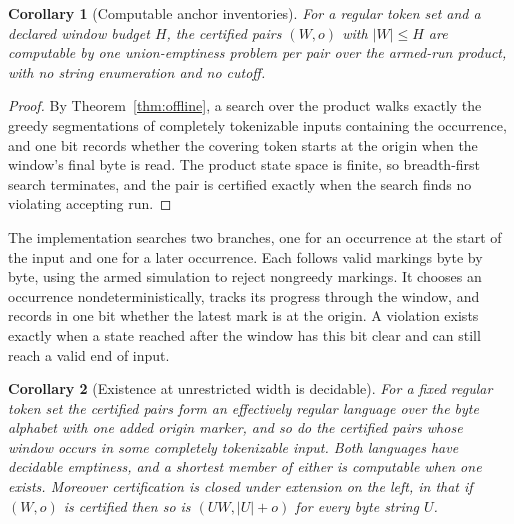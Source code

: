 \documentclass[11pt,a4paper]{article}
\theoremstyle{definition}
\theoremstyle{plain}
\newtheorem{corollary}{Corollary}
\begin{document}
\begin{corollary}[Computable anchor inventories]\label{cor:inventory}
For a regular token set and a declared window budget $H$, the certified pairs $(W, o)$ with $|W| \le H$ are computable
by one union-emptiness problem per pair over the armed-run product, with no string enumeration and no cutoff.
\end{corollary}

\begin{proof}
By Theorem~\ref{thm:offline}, a search over the product walks exactly the greedy segmentations of completely tokenizable
inputs containing the occurrence, and one bit records whether the covering token starts at the origin when the window's
final byte is read. The product state space is finite, so breadth-first search terminates, and the pair is certified
exactly when the search finds no violating accepting run.
\end{proof}

The implementation searches two branches, one for an occurrence at the start of the input and one for a later
occurrence. Each follows valid markings byte by byte, using the armed simulation to reject nongreedy markings. It
chooses an occurrence nondeterministically, tracks its progress through the window, and records in one bit whether the
latest mark is at the origin. A violation exists exactly when a state reached after the window has this bit clear and
can still reach a valid end of input.

\begin{corollary}[Existence at unrestricted width is decidable]\label{cor:existence}
For a fixed regular token set the certified pairs form an effectively regular language over the byte alphabet with one
added origin marker, and so do the certified pairs whose window occurs in some completely tokenizable input. Both
languages have decidable emptiness, and a shortest member of either is computable when one exists. Moreover
certification is closed under extension on the left, in that if $(W, o)$ is certified then so is $(UW, |U| + o)$ for
every byte string $U$.
\end{corollary}
\end{document}
